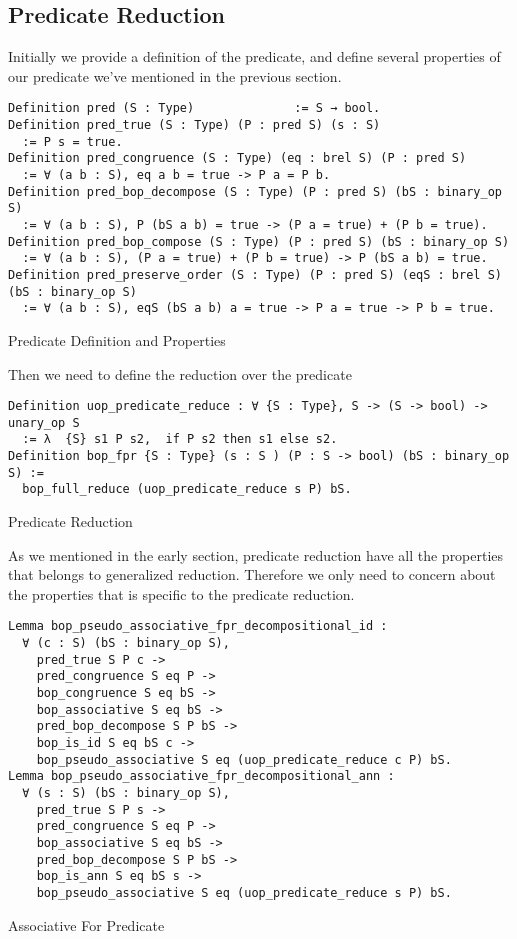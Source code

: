 \subsection{Predicate Reduction}
Initially we provide a definition of the predicate, and define several properties of our predicate we've mentioned in the previous section.
\begin{listing}[H]
\begin{verbatim}
Definition pred (S : Type)              := S → bool.
Definition pred_true (S : Type) (P : pred S) (s : S) 
  := P s = true. 
Definition pred_congruence (S : Type) (eq : brel S) (P : pred S) 
  := ∀ (a b : S), eq a b = true -> P a = P b.
Definition pred_bop_decompose (S : Type) (P : pred S) (bS : binary_op S) 
  := ∀ (a b : S), P (bS a b) = true -> (P a = true) + (P b = true).
Definition pred_bop_compose (S : Type) (P : pred S) (bS : binary_op S) 
  := ∀ (a b : S), (P a = true) + (P b = true) -> P (bS a b) = true.
Definition pred_preserve_order (S : Type) (P : pred S) (eqS : brel S) (bS : binary_op S)
  := ∀ (a b : S), eqS (bS a b) a = true -> P a = true -> P b = true.
\end{verbatim}
\caption{Predicate Definition and Properties} 
\label{coq:def:predicate}
\end{listing}
Then we need to define the reduction over the predicate 
\begin{listing}[H]
\begin{verbatim}
Definition uop_predicate_reduce : ∀ {S : Type}, S -> (S -> bool) -> unary_op S 
  := λ  {S} s1 P s2,  if P s2 then s1 else s2.
Definition bop_fpr {S : Type} (s : S ) (P : S -> bool) (bS : binary_op S) := 
  bop_full_reduce (uop_predicate_reduce s P) bS.
\end{verbatim}
\caption{Predicate Reduction} 
\label{coq:def:predicate_reduction}
\end{listing}
As we mentioned in the early section, predicate reduction have all the properties that belongs to generalized reduction. Therefore we only need to concern about the properties that is specific to the predicate reduction.
\begin{listing}[H]
\begin{verbatim}
Lemma bop_pseudo_associative_fpr_decompositional_id :
  ∀ (c : S) (bS : binary_op S),
    pred_true S P c ->
    pred_congruence S eq P ->
    bop_congruence S eq bS ->     
    bop_associative S eq bS -> 
    pred_bop_decompose S P bS ->
    bop_is_id S eq bS c -> 
    bop_pseudo_associative S eq (uop_predicate_reduce c P) bS. 
Lemma bop_pseudo_associative_fpr_decompositional_ann :
  ∀ (s : S) (bS : binary_op S),
    pred_true S P s -> 
    pred_congruence S eq P ->
    bop_associative S eq bS ->    
    pred_bop_decompose S P bS ->
    bop_is_ann S eq bS s ->     
    bop_pseudo_associative S eq (uop_predicate_reduce s P) bS.

\end{verbatim}
\caption{Associative For Predicate} 
\label{coq:proof:predicate_associative}
\end{listing}
